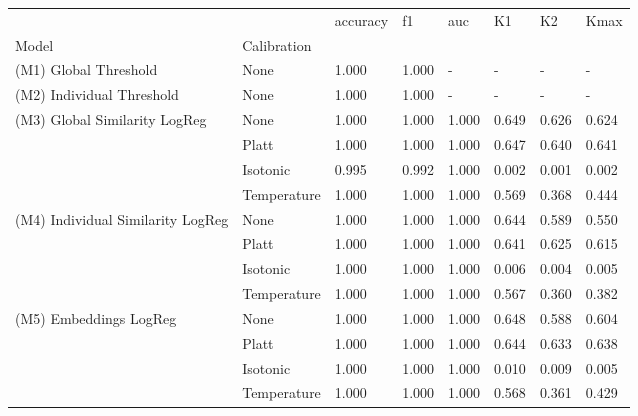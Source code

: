 \begin{tabular}{llllllll}
\toprule
 &  & accuracy & f1 & auc & K1 & K2 & Kmax \\
Model & Calibration &  &  &  &  &  &  \\
\midrule
(M1) Global Threshold & None & 1.000 & 1.000 & - & - & - & - \\
\cline{1-8}
(M2) Individual Threshold & None & 1.000 & 1.000 & - & - & - & - \\
\cline{1-8}
\multirow[t]{4}{*}{(M3) Global Similarity LogReg} & None & 1.000 & 1.000 & 1.000 & 0.649 & 0.626 & 0.624 \\
 & Platt & 1.000 & 1.000 & 1.000 & 0.647 & 0.640 & 0.641 \\
 & Isotonic & 0.995 & 0.992 & 1.000 & 0.002 & 0.001 & 0.002 \\
 & Temperature & 1.000 & 1.000 & 1.000 & 0.569 & 0.368 & 0.444 \\
\cline{1-8}
\multirow[t]{4}{*}{(M4) Individual Similarity LogReg} & None & 1.000 & 1.000 & 1.000 & 0.644 & 0.589 & 0.550 \\
 & Platt & 1.000 & 1.000 & 1.000 & 0.641 & 0.625 & 0.615 \\
 & Isotonic & 1.000 & 1.000 & 1.000 & 0.006 & 0.004 & 0.005 \\
 & Temperature & 1.000 & 1.000 & 1.000 & 0.567 & 0.360 & 0.382 \\
\cline{1-8}
\multirow[t]{4}{*}{(M5) Embeddings LogReg} & None & 1.000 & 1.000 & 1.000 & 0.648 & 0.588 & 0.604 \\
 & Platt & 1.000 & 1.000 & 1.000 & 0.644 & 0.633 & 0.638 \\
 & Isotonic & 1.000 & 1.000 & 1.000 & 0.010 & 0.009 & 0.005 \\
 & Temperature & 1.000 & 1.000 & 1.000 & 0.568 & 0.361 & 0.429 \\
\cline{1-8}
\bottomrule
\end{tabular}
